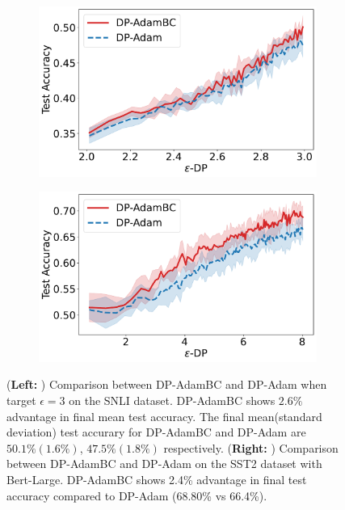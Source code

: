 \documentclass[letterpaper]{article} %
\begin{document}
\begin{figure}[htb]
     \centering
     \begin{subfigure}[b]{0.35\textwidth}
         \centering
         \includegraphics[width=\textwidth]{figs/addexp_eps3_snli.pdf}
     \end{subfigure}
     \begin{subfigure}[b]{0.35\textwidth}
         \centering
         \includegraphics[width=\textwidth]{figs/bert_large_repeated.pdf}
     \end{subfigure}
    \caption{(\textbf{Left: }) Comparison between DP-AdamBC and DP-Adam when target $\epsilon=3$ on the SNLI dataset. DP-AdamBC shows $2.6\%$ advantage in final mean test accuracy. The final mean(standard deviation) test accurary for DP-AdamBC and DP-Adam are $50.1\%(1.6\%)$, $47.5\%(1.8\%)$ respectively. (\textbf{Right: }) Comparison between DP-AdamBC and DP-Adam on the SST2 dataset with Bert-Large. DP-AdamBC shows 2.4\% advantage in final test accuracy compared to DP-Adam (68.80\% vs 66.4\%).}
    \label{fig:additional_exp}
\end{figure}
\end{document}
